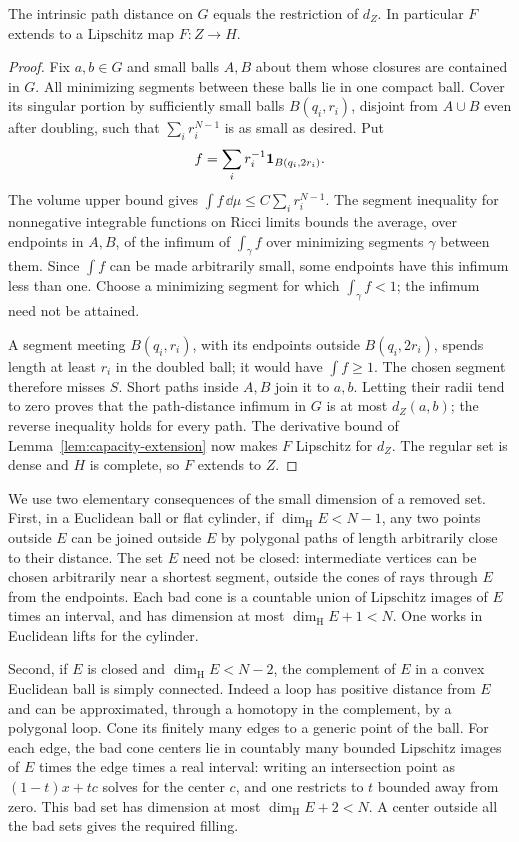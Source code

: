 \begin{lemma}\label{lem:regular-paths}
The intrinsic path distance on $G$ equals the restriction of $d_Z$.
In particular $F$ extends to a Lipschitz map $F:Z\to H$.
\end{lemma}
\begin{proof}
Fix $a,b\in G$ and small balls $A,B$ about them whose closures are
contained in $G$. All minimizing segments between these balls lie
in one compact ball. Cover its singular portion by sufficiently
small balls $B(q_i,r_i)$, disjoint from $A\cup B$ even after doubling,
such that $\sum_i r_i^{N-1}$ is as small as desired. Put
\[
             f=\sum_i r_i^{-1}{\bf1}_{B(q_i,2r_i)}.
\]
The volume upper bound gives
$\int f\,\dd\mu\le C\sum_i r_i^{N-1}$.
The segment inequality for nonnegative integrable functions on Ricci
limits \cite[Theorem~2.15]{CheegerColdingIII} bounds the average, over
endpoints in $A,B$, of the infimum of $\int_\gamma f$ over minimizing
segments $\gamma$ between them. Since $\int f$ can be made arbitrarily
small, some endpoints have this infimum less than one. Choose a
minimizing segment for which $\int_\gamma f<1$; the infimum need not
be attained.

A segment meeting $B(q_i,r_i)$, with its endpoints outside
$B(q_i,2r_i)$, spends length at least $r_i$ in the doubled ball;
it would have $\int f\ge1$. The chosen segment therefore misses
$S$. Short paths inside $A,B$ join it to $a,b$. Letting their radii
tend to zero proves that the path-distance infimum in $G$ is at
most $d_Z(a,b)$; the reverse inequality holds for every path.
The derivative bound of Lemma~\ref{lem:capacity-extension} now
makes $F$ Lipschitz for $d_Z$. The regular set is dense and $H$
is complete, so $F$ extends to $Z$.
\end{proof}

We use two elementary consequences of the small dimension of a removed
set.  First, in a Euclidean ball or flat cylinder, if
$\dim_{\mathrm H}E<N-1$, any two points outside $E$ can be joined
outside $E$ by polygonal paths of length arbitrarily close to their
distance.  The set $E$ need not be closed: intermediate vertices can
be chosen arbitrarily near a shortest segment, outside the cones
of rays through $E$ from the endpoints. Each bad cone is a
countable union of Lipschitz images of $E$ times an interval, and
has dimension at most $\dim_{\mathrm H}E+1<N$. One works in
Euclidean lifts for the cylinder.

Second, if $E$ is closed and $\dim_{\mathrm H}E<N-2$, the complement of
$E$ in a convex Euclidean ball is simply connected. Indeed a loop
has positive distance from $E$ and can be approximated, through a
homotopy in the complement, by a polygonal loop. Cone its finitely
many edges to a generic point of the ball. For each edge, the bad
cone centers lie in countably many bounded Lipschitz images of
$E$ times the edge times a real interval: writing an intersection
point as $(1-t)x+tc$ solves for the center $c$, and one restricts
to $t$ bounded away from zero. This bad set has dimension at most
$\dim_{\mathrm H}E+2<N$. A center outside all the bad sets gives
the required filling.

